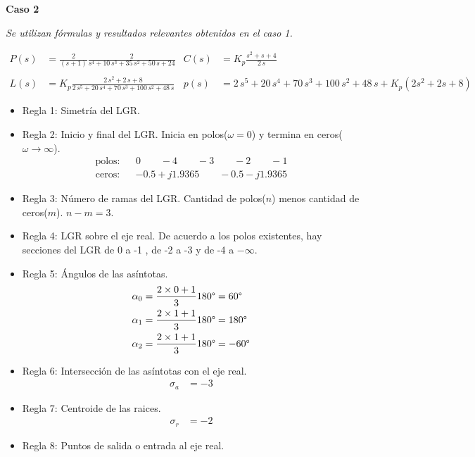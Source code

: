 \textbf{Caso 2}

\textit{Se utilizan fórmulas y resultados relevantes obtenidos en el caso 1.}

\begin{align*}
  P(s) &= \frac{2}{(s+1)}
\frac{2}{s^4+10\,s^3+35\,s^2+50\,s+24}
  &
  C(s) &= K_p
\frac{s^2+s+4}{2\,s}
  \\\\
  L(s) &= K_p
\frac{2\,s^2+2\,s+8}{2\,s^5+20\,s^4+70\,s^3+100\,s^2+48\,s}
  &
  p(s) &= 
2\,s^5+20\,s^4+70\,s^3+100\,s^2+48\,s + K_p(2s^2+2s+8)
\end{align*}
\begin{itemize}
  \item Regla 1: Simetría del LGR.
  \item Regla 2: Inicio y final del LGR. Inicia en polos($\omega = 0$) y termina en ceros($\omega \rightarrow \infty$).
  \begin{align*}
    \text{polos:} && 0 \qquad -4 \qquad -3 \qquad -2 \qquad -1
  \end{align*}
  \begin{align*}
    \text{ceros:} && -0.5 + j1.9365 \qquad -0.5 - j1.9365
  \end{align*}

  \item Regla 3: Número de ramas del LGR. Cantidad de polos($n$) menos cantidad de ceros($m$). $n-m = 3$.
  \item Regla 4: LGR sobre el eje real. 
  De acuerdo a los polos existentes, hay secciones del LGR de 0 a -1 , de -2 a -3 y  de -4 a $-\infty$.
  \item Regla 5: Ángulos de las asíntotas.
  \begin{align*}
    \alpha_0 &= \frac{2\times0 + 1}{3}  180\degree  = 60\degree
    \\
    \alpha_1 &= \frac{2\times1 + 1}{3}  180\degree = 180\degree
    \\
    \alpha_2 &= \frac{2\times1 + 1}{3}  180\degree  =-60\degree  
  \end{align*}
  \item Regla 6: Intersección de las asíntotas con el eje real.
  \begin{align*}
    \sigma_a &= -3
  \end{align*}
  \item Regla 7: Centroide de las raices.
  \begin{align*}
    \sigma_r &= -2
  \end{align*}
  \item Regla 8: Puntos de salida o entrada al eje real.


\end{itemize}
